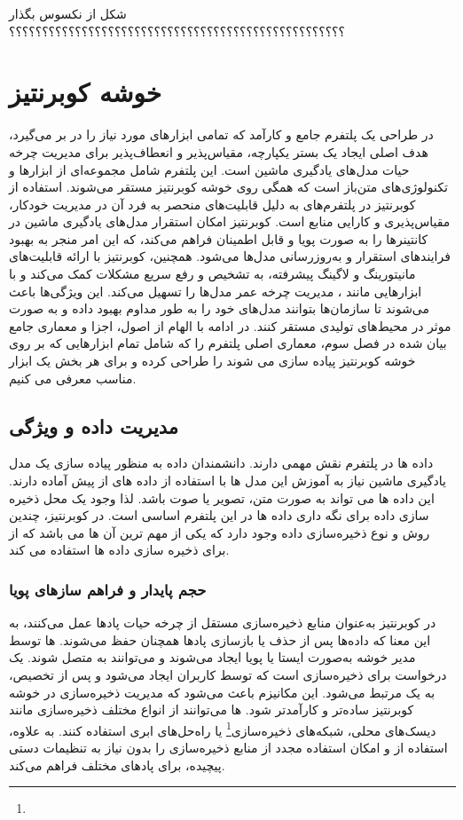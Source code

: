 شکل از نکسوس بگذار ؟؟؟؟؟؟؟؟؟؟؟؟؟؟؟؟؟؟؟؟؟؟؟؟؟؟؟؟؟؟؟؟؟؟؟؟؟؟؟؟؟؟؟؟؟؟؟؟؟؟؟

\section{خوشه کوبرنتیز}
در طراحی یک پلتفرم  جامع و کارآمد که تمامی ابزارهای مورد نیاز را در بر می‌گیرد، هدف اصلی ایجاد یک بستر یکپارچه، مقیاس‌پذیر و انعطاف‌پذیر برای مدیریت چرخه حیات مدل‌های یادگیری ماشین است. این پلتفرم شامل مجموعه‌ای از ابزارها و تکنولوژی‌های متن‌باز است که همگی روی خوشه کوبرنتیز مستقر می‌شوند. استفاده از کوبرنتیز در پلتفرم‌های  به دلیل قابلیت‌های منحصر به فرد آن در مدیریت خودکار، مقیاس‌پذیری و کارایی منابع است. کوبرنتیز امکان استقرار مدل‌های یادگیری ماشین در کانتینرها را به صورت پویا و قابل اطمینان فراهم می‌کند، که این امر منجر به بهبود فرایندهای استقرار و به‌روزرسانی مدل‌ها می‌شود. همچنین، کوبرنتیز با ارائه قابلیت‌های مانیتورینگ و لاگینگ پیشرفته، به تشخیص و رفع سریع مشکلات کمک می‌کند و با ابزارهایی مانند ، مدیریت چرخه عمر مدل‌ها را تسهیل می‌کند. این ویژگی‌ها باعث می‌شوند تا سازمان‌ها بتوانند مدل‌های خود را به طور مداوم بهبود داده و به صورت موثر در محیط‌های تولیدی مستقر کنند. در ادامه با الهام از اصول، اجزا و معماری جامع بیان شده در فصل سوم، معماری اصلی پلتفرم  را که شامل تمام ابزارهایی که بر روی خوشه کوبرنتیز پیاده سازی می شوند را طراحی کرده و برای هر بخش یک ابزار مناسب معرفی می کنیم.

\subsection{مدیریت داده و ویژگی}
داده ها در پلتفرم  نقش مهمی دارند. دانشمندان داده به منظور پیاده سازی یک مدل یادگیری ماشین نیاز به آموزش این مدل ها با استفاده از داده های از پیش آماده دارند. این داده ها می تواند به صورت متن، تصویر یا صوت باشد. لذا وجود یک محل ذخیره سازی داده برای نگه داری داده ها در این پلتفرم اساسی است. در کوبرنتیز، چندین روش و نوع ذخیره‌سازی داده وجود دارد که یکی از مهم ترین آن ها  می باشد که از  برای ذخیره سازی داده ها استفاده می کند.
 
\subsubsection{حجم پایدار و فراهم سازهای پویا}
در کوبرنتیز  به‌عنوان منابع ذخیره‌سازی مستقل از چرخه حیات پادها عمل می‌کنند، به این معنا که داده‌ها پس از حذف یا بازسازی پادها همچنان حفظ می‌شوند. ها توسط مدیر خوشه به‌صورت ایستا یا پویا ایجاد می‌شوند و می‌توانند به  متصل شوند.  یک درخواست برای ذخیره‌سازی است که توسط کاربران ایجاد می‌شود و پس از تخصیص، به یک  مرتبط می‌شود. این مکانیزم باعث می‌شود که مدیریت ذخیره‌سازی در خوشه کوبرنتیز ساده‌تر و کارآمدتر شود. ها می‌توانند از انواع مختلف ذخیره‌سازی مانند دیسک‌های محلی، شبکه‌های ذخیره‌سازی\footnote{} یا راه‌حل‌های ابری استفاده کنند. به علاوه، استفاده از  و  امکان استفاده مجدد از منابع ذخیره‌سازی را بدون نیاز به تنظیمات دستی پیچیده، برای پادهای مختلف فراهم می‌کند.

